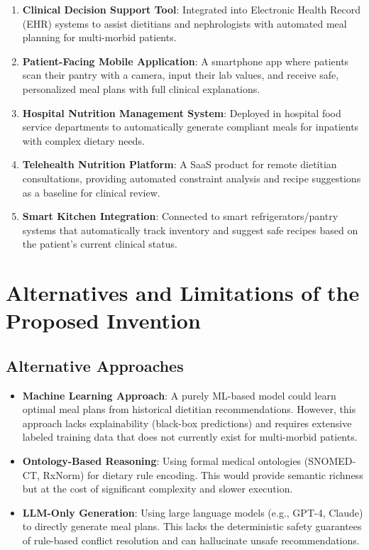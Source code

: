\documentclass[a4paper,12pt]{article}
\begin{document}
\begin{enumerate}[itemsep=0.3em]
    \item \textbf{Clinical Decision Support Tool}: Integrated into Electronic Health Record (EHR) systems to assist dietitians and nephrologists with automated meal planning for multi-morbid patients.
    \item \textbf{Patient-Facing Mobile Application}: A smartphone app where patients scan their pantry with a camera, input their lab values, and receive safe, personalized meal plans with full clinical explanations.
    \item \textbf{Hospital Nutrition Management System}: Deployed in hospital food service departments to automatically generate compliant meals for inpatients with complex dietary needs.
    \item \textbf{Telehealth Nutrition Platform}: A SaaS product for remote dietitian consultations, providing automated constraint analysis and recipe suggestions as a baseline for clinical review.
    \item \textbf{Smart Kitchen Integration}: Connected to smart refrigerators/pantry systems that automatically track inventory and suggest safe recipes based on the patient's current clinical status.
\end{enumerate}

\section*{Alternatives and Limitations of the Proposed Invention}

\subsection*{Alternative Approaches}
\begin{itemize}[itemsep=0.3em]
    \item \textbf{Machine Learning Approach}: A purely ML-based model could learn optimal meal plans from historical dietitian recommendations. However, this approach lacks explainability (black-box predictions) and requires extensive labeled training data that does not currently exist for multi-morbid patients.
    \item \textbf{Ontology-Based Reasoning}: Using formal medical ontologies (SNOMED-CT, RxNorm) for dietary rule encoding. This would provide semantic richness but at the cost of significant complexity and slower execution.
    \item \textbf{LLM-Only Generation}: Using large language models (e.g., GPT-4, Claude) to directly generate meal plans. This lacks the deterministic safety guarantees of rule-based conflict resolution and can hallucinate unsafe recommendations.
\end{itemize}
\end{document}
